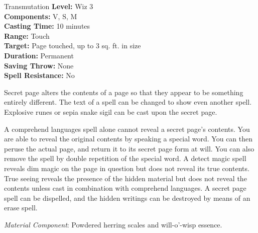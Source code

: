{Transmutation}
{
	\textbf{Level:}
	Wiz 3\\
	\textbf{Components:}
	V, S, M\\
	\textbf{Casting Time:}
	10 minutes\\
	\textbf{Range:}
	Touch\\
	\textbf{Target:}
	Page touched, up to 3 sq. ft. in size\\
	\textbf{Duration:}
	Permanent\\
	\textbf{Saving Throw:}
	None\\
	\textbf{Spell Resistance:}
	No\\
}
{
	Secret page alters the contents of a page so that they appear to be something entirely different. The text of a spell can be changed to show even another spell. Explosive runes or sepia snake sigil can be cast upon the secret page.

	A comprehend languages spell alone cannot reveal a secret page's contents. You are able to reveal the original contents by speaking a special word. You can then peruse the actual page, and return it to its secret page form at will. You can also remove the spell by double repetition of the special word. A detect magic spell reveals dim magic on the page in question but does not reveal its true contents. True seeing reveals the presence of the hidden material but does not reveal the contents unless cast in combination with comprehend languages. A secret page spell can be dispelled, and the hidden writings can be destroyed by means of an erase spell.

	\textit{Material Component}:
	Powdered herring scales and will-o'-wisp essence.

}
